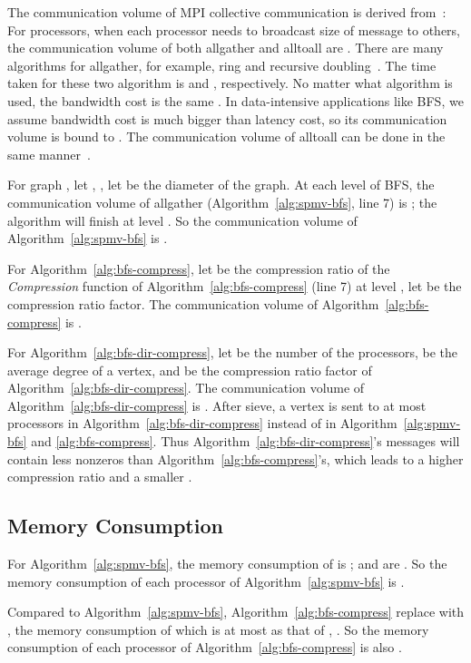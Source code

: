 \documentclass[conference]{IEEEtran}
\begin{document}
The communication volume of MPI collective communication is derived
from~\cite{Thakur:03,Pjesivac-Grbovic:2007}: For  processors, when each
processor needs to broadcast  size of message to others, the
communication volume of both allgather and alltoall are .  There are
many algorithms for allgather, for example, ring and recursive
doubling~\cite{Thakur:03}. The time taken for these two algorithm is
 and , respectively. No matter what algorithm is
used, the bandwidth cost is the same . In
data-intensive applications like BFS, we assume bandwidth cost is much bigger
than latency cost, so its communication volume is bound to . The
communication volume of alltoall can be done in the same
manner~\cite{Pjesivac-Grbovic:2007}.

For graph , let , , let  be the diameter of the
graph. At each level of BFS, the communication volume of allgather
(Algorithm~\ref{alg:spmv-bfs}, line 7) is ; the algorithm will finish at
level . So the communication volume of Algorithm~\ref{alg:spmv-bfs} is .

For Algorithm~\ref{alg:bfs-compress}, let  be the compression
ratio of the \textit{Compression} function of Algorithm~\ref{alg:bfs-compress}
(line 7) at level , let  be
the compression ratio factor.  The communication volume of
Algorithm~\ref{alg:bfs-compress} is .

For Algorithm~\ref{alg:bfs-dir-compress}, let  be the number of the
processors,  be the average degree of a vertex, and  be the
compression ratio factor of Algorithm~\ref{alg:bfs-dir-compress}. The
communication volume of Algorithm~\ref{alg:bfs-dir-compress} is . After sieve, a vertex is sent to at most  processors in
Algorithm~\ref{alg:bfs-dir-compress} instead of  in
Algorithm~\ref{alg:spmv-bfs} and \ref{alg:bfs-compress}.  Thus
Algorithm~\ref{alg:bfs-dir-compress}'s messages will contain less nonzeros
than Algorithm~\ref{alg:bfs-compress}'s, which leads to a higher compression
ratio and a smaller .

\subsection{Memory Consumption}

For Algorithm~\ref{alg:spmv-bfs}, the memory consumption of  is ;
 and  are . So the memory consumption of each processor of
Algorithm~\ref{alg:spmv-bfs} is .

Compared to Algorithm~\ref{alg:spmv-bfs}, Algorithm~\ref{alg:bfs-compress}
replace  with , the memory consumption of which is at most as
that of , .  So the memory consumption of each processor of
Algorithm~\ref{alg:bfs-compress} is also .
\end{document}
